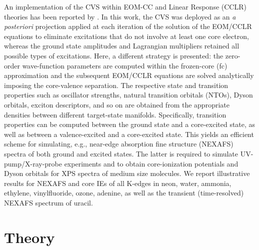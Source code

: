 \documentclass[journal=jctcce,manuscript=article]{achemso}
\begin{document}
An implementation of the CVS within EOM-CC and Linear Response (CCLR) theories has been reported by \citeauthor{coriani2015jcp}\cite{coriani2015jcp}. In this work, the CVS was deployed as an {\em{a posteriori}} projection applied at each iteration of the solution of the EOM/CCLR equations to eliminate excitations that do not involve at least one core electron, 
whereas the ground state amplitudes and Lagrangian multipliers retained all possible types of excitations.  
Here, a different strategy is presented: the zero-order wave-function parameters are computed within the frozen-core (fc) approximation and the subsequent EOM/CCLR equations are solved analytically imposing the core-valence separation. 
The respective state and transition properties such as oscillator strengths, natural transition orbitals (NTOs), Dyson orbitals, exciton descriptors, and so on are obtained from the appropriate densities between different target-state manifolds. Specifically, transition properties  
can be computed between the ground state and a core-excited state, as well as between a valence-excited and a core-excited state. 
This yields an efficient scheme for simulating, e.g., near-edge absorption fine structure (NEXAFS) spectra of both ground and excited states. The latter is required to simulate UV-pump/X-ray-probe experiments and to obtain core-ionization potentials and Dyson orbitals for XPS spectra of medium size molecules.
We report illustrative results for NEXAFS and core IEs
of all K-edges in neon, water, ammonia, ethylene, vinylfluoride, ozone, adenine, as well as the transient (time-resolved) NEXAFS spectrum of uracil.

\section{Theory}
\end{document}

